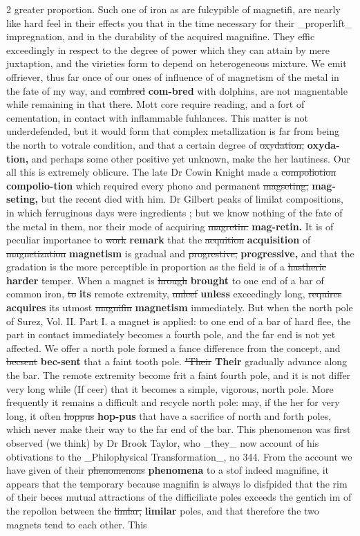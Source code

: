 \documentclass[10pt]{article}
\begin{document}
\begin{multicols}{2}
greater proportion. Such one of iron as are fulcypible of magnetifi, are nearly like hard feel in their effects you that in the time necessary for their \_properlift\_ impregnation, and in the durability of the acquired magnifine. They effic exceedingly in respect to the degree of power which they can attain by mere juxtaption, and the virieties form to depend on heterogeneous mixture. We emit offriever, thus far once of our ones of influence of of magnetism of the metal in the fate of my way, and \sout{combred} \textbf{com-bred} with dolphins, are not magnentable while remaining in that there. Mott core require reading, and a fort of cementation, in contact with inflammable fuhlances. This matter is not underdefended, but it would form that complex metallization is far from being the north to votrale condition, and that a certain degree of \sout{oxydation,} \textbf{oxyda-tion,} and perhaps some other positive yet unknown, make the her lautiness. Our all this is extremely oblicure. The late Dr Cowin Knight made a \sout{compoliotion} \textbf{compolio-tion} which required every phono and permanent \sout{magseting,} \textbf{mag-seting,} but the recent died with him. Dr Gilbert peaks of limilat compositions, in which ferruginous days were ingredients ; but we know nothing of the fate of the metal in them, nor their mode of acquiring \sout{magretin.} \textbf{mag-retin.} It is of peculiar importance to \sout{work} \textbf{remark} that the \sout{acquition} \textbf{acquisition} of \sout{magnetization} \textbf{magnetism} is gradual and \sout{progrestive,} \textbf{progressive,} and that the gradation is the more perceptible in proportion as the field is of a \sout{hastheric} \textbf{harder} temper. When a magnet is \sout{hrough} \textbf{brought} to one end of a bar of common iron, \sout{to} \textbf{its} remote extremity, \sout{unleef} \textbf{unless} exceedingly long, \sout{requires} \textbf{acquires} its utmost \sout{magnifin} \textbf{magnetism} immediately. But when the north pole of Surez, Vol. II. Part I. a magnet is applied: to one end of a bar of hard flee, the part in contact immediately becomes a fourth pole, and the far end is not yet affected. We offer a north pole formed a fance difference from the concept, and \sout{becsent} \textbf{bec-sent} that a faint tooth pole. \sout{"Their} \textbf{Their} gradually advance along the bar. The remote extremity become frit a faint fourth pole, and it is not differ very long while (If ceer) that it becomes a simple, vigorous, north pole. More frequently it remains a difficult and recycle north pole: may, if the her for very long, it often \sout{hoppus} \textbf{hop-pus} that have a sacrifice of north and forth poles, which never make their way to the far end of the bar. This phenomenon was first observed (we think) by Dr Brook Taylor, who \_they\_ now account of his obtivations to the \_Philophysical Transformation\_, no 344. From the account we have given of their \sout{phenomenons} \textbf{phenomena} to a stof indeed magnifine, it appears that the temporary because magnifin is always lo disfpided that the rim of their beces mutual attractions of the difficiliate poles exceeds the gentich im of the repollon between the \sout{limlar,} \textbf{limilar} poles, and that therefore the two magnets tend to each other. This 
\end{multicols}
\end{document}
